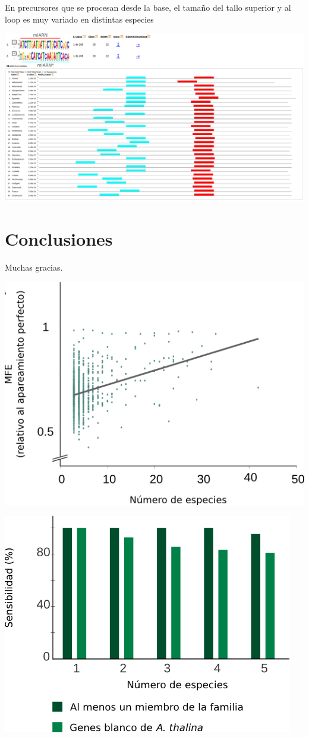 \documentclass{beamer}
\begin{document}
\begin{frame}{En precursores que se procesan desde la base, el tamaño del tallo superior y al loop es muy variado en distintas especies}
	\begin{center}
		\includegraphics[width=1\textwidth]{img/miR172_meme.png}
	\end{center}
\end{frame}



\section{Conclusiones}


\begin{frame}{}
	\begin{center}
		\Huge Muchas gracias.
	\end{center}
\end{frame}

\begin{frame}{}
	\begin{center}
	\end{center}
\end{frame}


\begin{frame}{}
	\begin{center}
		\includegraphics[width=.5\textwidth]{img/extras/NAR_fig3A.png}
	\end{center}
\end{frame}

\begin{frame}{}
	\begin{center}
		\includegraphics[width=.5\textwidth]{img/extras/NAR_fig3B.png}
	\end{center}
\end{frame}
\end{document}
